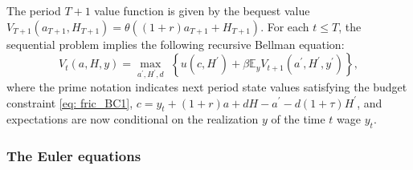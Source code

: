 \documentclass[12pt]{article}
\newcommand{\DChSet}{\mathbb{D}}
\begin{document}
The period $T+1$ value function is given by the bequest value $V_{T+1}(a_{T+1}, H_{T+1}) = \theta((1+r)a_{T+1} +  H_{T+1})$. For each $t\leq T$, the sequential problem implies the following recursive Bellman equation:
%
\begin{equation}\label{eq: Bellman_app2}
    V_{t}(a,H,y) = \max_{a^{\prime},H^{\prime}, d}\,\,\left\{ u(c,H^{\prime}) + \beta\mathbb{E}_{y}V_{t+1}(a^{\prime},H^{\prime},y^{\prime})\right\},
\end{equation}
where the prime notation indicates next period state values satisfying the budget constraint \eqref{eq: fric_BC1}, $c =  y_{t} + (1+r)a + dH - a^{\prime} - d(1+\tau)H^{\prime}$, and expectations are now conditional on the realization $y$ of the time $t$ wage $y_{t}$. 



\subsubsection{The Euler equations}
\end{document}
